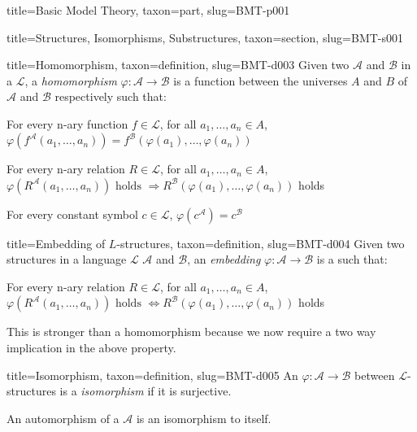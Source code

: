 \documentclass[a4paper]{article}
\begin{document}
\begin{tree}{title={Basic Model Theory}, taxon={part}, slug={BMT-p001}}
\begin{tree}{title={Structures, Isomorphisms, Substructures}, taxon={section}, slug={BMT-s001}}
\begin{tree}{title={Homomorphism}, taxon={definition}, slug={BMT-d003}}
Given two  \(\mathcal {A}\) and \(\mathcal {B}\) in a  \(\mathcal {L}\), a \emph{homomorphism} \(\varphi :  \mathcal {A}  \rightarrow   \mathcal {B}\)
is a function between the universes \(A\) and \(B\) of \(\mathcal {A}\) and \(\mathcal {B}\) respectively such that:\par{ For every n-ary function \(f \in   \mathcal {L}\), for all \(a_1, \dots , a_n \in  A\), \(\varphi (f^{ \mathcal {A}}(a_1, \dots , a_n)) = f^{ \mathcal {B}}( \varphi (a_1), \dots ,  \varphi (a_n))\)}\par{For every n-ary relation \(R \in   \mathcal {L}\), for all \(a_1, \dots , a_n  \in  A\), \(\varphi (R^{ \mathcal {A}}(a_1, \dots , a_n))  \text { holds }  \Rightarrow  R^{ \mathcal {B}}( \varphi (a_1),  \dots ,  \varphi (a_n))\) holds}\par{For every constant symbol \(c  \in   \mathcal {L}\), \(\varphi (c^{ \mathcal {A}}) =c^{ \mathcal {B}}\)}
\end{tree}

\begin{tree}{title={Embedding of \(L\)-structures}, taxon={definition}, slug={BMT-d004}}
Given two structures in a language \(\mathcal {L}\) \(\mathcal {A}\) and \(\mathcal {B}\), an \emph{embedding} \(\varphi :  \mathcal {A}  \rightarrow   \mathcal {B}\)
is a  such that:\par{For every n-ary relation \(R \in   \mathcal {L}\), for all \(a_1, \dots , a_n  \in  A\), \(\varphi (R^{ \mathcal {A}}(a_1, \dots , a_n))  \text { holds }  \Leftrightarrow  R^{ \mathcal {B}}( \varphi (a_1),  \dots ,  \varphi (a_n))\) holds}\par{This is stronger than a homomorphism because we now require a two way implication in the above property.}
\end{tree}

\begin{tree}{title={Isomorphism}, taxon={definition}, slug={BMT-d005}}
An  \(\varphi :  \mathcal {A}  \rightarrow   \mathcal {B}\) between \(\mathcal {L}\)-structures is a \emph{isomorphism} if it is surjective.

An automorphism of a  \(\mathcal {A}\) is an isomorphism to itself.

\end{tree}


\end{tree}
\end{tree}
\end{document}
